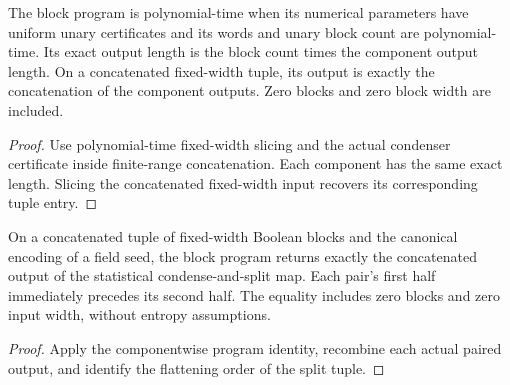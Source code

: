 \begin{theorem}
  \label{thm:lowerbounds-algebraic-explicit-block-program}
  \leanok
  The block program is polynomial-time when its numerical parameters have
  uniform unary certificates and its words and unary block count are
  polynomial-time. Its exact output length is the block count times the
  component output length. On a concatenated fixed-width tuple, its output
  is exactly the concatenation of the component outputs. Zero blocks and
  zero block width are included.
\end{theorem}
\begin{proof}
  \leanok
  Use polynomial-time fixed-width slicing and the actual condenser
  certificate inside finite-range concatenation. Each component has
  the same exact length. Slicing the concatenated fixed-width input
  recovers its corresponding tuple entry.
\end{proof}

\begin{theorem}
  \label{thm:lowerbounds-algebraic-explicit-block-correctness}
  \leanok
  On a concatenated tuple of fixed-width Boolean blocks and the canonical
  encoding of a field seed, the block program returns exactly the
  concatenated output of the statistical condense-and-split map. Each
  pair's first half immediately precedes its second half. The equality
  includes zero blocks and zero input width, without entropy assumptions.
\end{theorem}
\begin{proof}
  \leanok
  Apply the componentwise program identity, recombine each actual paired
  output, and identify the flattening order of the split tuple.
\end{proof}

